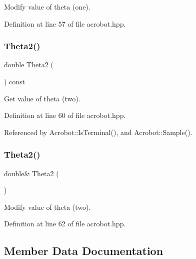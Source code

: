 Modify value of theta (one). 



Definition at line 57 of file acrobot.\+hpp.

\mbox{\label{classmlpack_1_1rl_1_1Acrobot_1_1State_a057c077512000b708c6db341e1669ee3}} 
\subsubsection{Theta2()\hspace{0.1cm}{\footnotesize\ttfamily [1/2]}}
{\footnotesize\ttfamily double Theta2 (\begin{DoxyParamCaption}{ }\end{DoxyParamCaption}) const\hspace{0.3cm}{\ttfamily [inline]}}



Get value of theta (two). 



Definition at line 60 of file acrobot.\+hpp.



Referenced by Acrobot\+::\+Is\+Terminal(), and Acrobot\+::\+Sample().

\mbox{\label{classmlpack_1_1rl_1_1Acrobot_1_1State_aec1a00c1e9b5bafae918889ada482db0}} 
\subsubsection{Theta2()\hspace{0.1cm}{\footnotesize\ttfamily [2/2]}}
{\footnotesize\ttfamily double\& Theta2 (\begin{DoxyParamCaption}{ }\end{DoxyParamCaption})\hspace{0.3cm}{\ttfamily [inline]}}



Modify value of theta (two). 



Definition at line 62 of file acrobot.\+hpp.



\subsection{Member Data Documentation}
\mbox{\label{classmlpack_1_1rl_1_1Acrobot_1_1State_ae813298f34ef9d793885fc04b54dff99}} 
